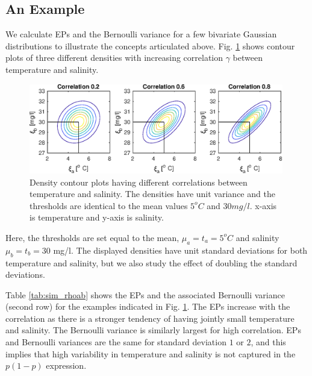 \documentclass[aoas]{imsart}
\begin{document}
\subsection{An Example}

We calculate EPs and the Bernoulli variance for a few bivariate
Gaussian distributions to illustrate the concepts articulated above.
Fig. \ref{illus_bivarDens} shows contour plots of three different
densities with increasing correlation $\gamma$ between temperature and
salinity.
\begin{figure}[h!] \centering
  \includegraphics[width=0.99\textwidth]{Figures/illus_bivar.eps}
  \caption{Density contour plots having different correlations between
    temperature and salinity. The densities have unit variance and the
    thresholds are identical to the mean values $5^o C$ and
    $30 mg/l$. x-axis is temperature and y-axis is salinity.}
\label{illus_bivarDens}
\end{figure}
Here, the thresholds are set equal to the mean, $\mu_a=t_a=5^o C$ and
salinity $\mu_b=t_b=30$ mg/l. The displayed densities have unit
standard deviations for both temperature and salinity, but we also
study the effect of doubling the standard deviations.

Table \ref{tab:sim_rhoab} shows the EPs and the associated Bernoulli
variance (second row) for the examples indicated in
Fig. \ref{illus_bivarDens}. The EPs increase with the correlation as
there is a stronger tendency of having jointly small temperature and
salinity. The Bernoulli variance is similarly largest for high
correlation. EPs and Bernoulli variances are the same for standard
deviation $1$ or $2$, and this implies that high variability in
temperature and salinity is not captured in the $p(1-p)$ expression.
\end{document}
